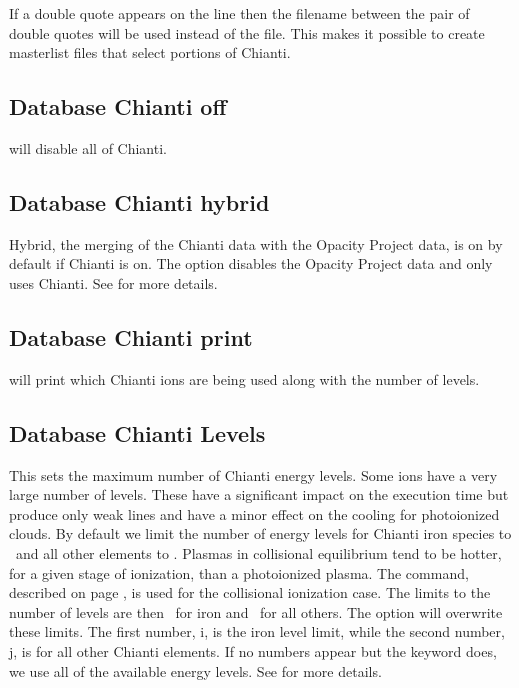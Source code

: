 If a double quote appears on the line then the filename
between the pair of double quotes will be used instead of
the  file.
This makes it possible to create masterlist files that select portions
of Chianti.

\subsection{Database Chianti off} 
will disable all of Chianti.

\subsection{Database Chianti hybrid} 
Hybrid, the merging of the Chianti data with the Opacity Project data, 
is on by default if Chianti is on.
The  option disables the Opacity Project data and only uses Chianti.
See \citet{2013MNRAS.429.3133L} for more details.

\subsection{Database Chianti print} 
will print which Chianti ions are being used
along with the number of levels.
 
\subsection{Database Chianti Levels} 
\label{sec:AtomChiantiLevels}
This sets the maximum number of Chianti energy levels. 
Some ions have a very large number of levels.
These have a significant impact
on the execution time but produce only weak lines and have a minor effect
on the cooling for photoionized clouds.
By default we limit the number of energy levels for Chianti iron species to 
\nDefaultPhotoLevelsFe\ and all other elements to \nDefaultPhotoLevels.
Plasmas in collisional equilibrium tend to be hotter, for a given
stage of ionization, than a photoionized plasma.  
The  command, described on
page \pageref{sec:CommandCoronalEquilibrium}, is used for
the collisional ionization case.
The limits to the number of levels are then \nDefaultCollLevelsFe\ for iron 
and \nDefaultCollLevels\ for all others.
The  option will overwrite these limits.
The first number, i, is the iron level limit, while the second number, 
j, is for all other Chianti elements.
If no numbers appear but the keyword  does, we use all 
of the available energy levels.
See \citet{2013MNRAS.429.3133L} for more details.

